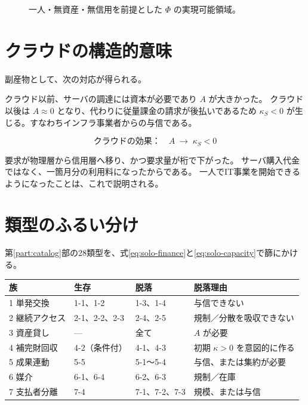 \begin{figure}[htbp]
\centering
{}
\caption{一人・無資産・無信用を前提とした $\Phi$ の実現可能領域。}
\label{fig:solo-quadrant}
\end{figure}

\section{クラウドの構造的意味}

副産物として、次の対応が得られる。

クラウド以前、サーバの調達には資本が必要であり $A$ が大きかった。
クラウド以後は $A\approx 0$ となり、代わりに従量課金の請求が後払いであるため
$\kappa_S<0$ が生じる。すなわちインフラ事業者からの与信である。

\begin{equation}
\text{クラウドの効果：} \quad A \;\longrightarrow\; \kappa_S<0
\end{equation}

要求が物理層から信用層へ移り、かつ要求量が桁で下がった。
サーバ購入代金ではなく、一箇月分の利用料になったからである。
一人でIT事業を開始できるようになったことは、これで説明される。

\section{類型のふるい分け}

第\ref{part:catalog}部の28類型を、式\eqref{eq:solo-finance}と\eqref{eq:solo-capacity}で篩にかける。

\begin{center}
\begin{tabularx}{\textwidth}{@{}lXXX@{}}
\toprule
族 & 生存 & 脱落 & 脱落理由 \\
\midrule
1 単発交換 & 1-1、1-2 & 1-3、1-4 & 与信できない \\
2 継続アクセス & 2-1、2-2、2-3 & 2-4、2-5 & 規制／分散を吸収できない \\
3 資産貸し & --- & 全て & $A$ が必要 \\
4 補完財回収 & 4-2（条件付） & 4-1、4-3 & 初期 $\kappa>0$ を意図的に作る \\
5 成果連動 & 5-5 & 5-1〜5-4 & 与信、または集約が必要 \\
6 媒介 & 6-1、6-4 & 6-2、6-3 & 規制／在庫 \\
7 支払者分離 & 7-4 & 7-1、7-2、7-3 & 規模、または与信 \\
\bottomrule
\end{tabularx}
\label{tab:solo-type-filter}
\end{center}

